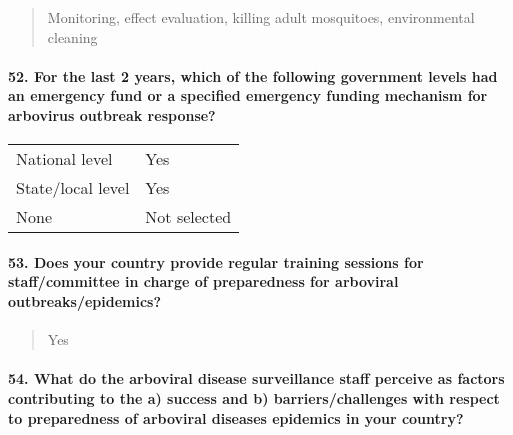 \documentclass[
]{article}
\begin{document}
\begin{quote}
Monitoring, effect evaluation, killing adult mosquitoes, environmental
cleaning
\end{quote}

\hypertarget{for-the-last-2-years-which-of-the-following-government-levels-had-an-emergency-fund-or-a-specified-emergency-funding-mechanism-for-arbovirus-outbreak-response}{%
\paragraph{52. For the last 2 years, which of the following government
levels had an emergency fund or a specified emergency funding mechanism
for arbovirus outbreak
response?}\label{for-the-last-2-years-which-of-the-following-government-levels-had-an-emergency-fund-or-a-specified-emergency-funding-mechanism-for-arbovirus-outbreak-response}}

\begin{longtable}[]{@{}ll@{}}
\toprule
\endhead
National level & Yes \\
State/local level & Yes \\
None & Not selected \\
\bottomrule
\end{longtable}

\hypertarget{does-your-country-provide-regular-training-sessions-for-staffcommittee-in-charge-of-preparedness-for-arboviral-outbreaksepidemics}{%
\paragraph{53. Does your country provide regular training sessions for
staff/committee in charge of preparedness for arboviral
outbreaks/epidemics?}\label{does-your-country-provide-regular-training-sessions-for-staffcommittee-in-charge-of-preparedness-for-arboviral-outbreaksepidemics}}

\begin{quote}
Yes
\end{quote}

\hypertarget{what-do-the-arboviral-disease-surveillance-staff-perceive-as-factors-contributing-to-the-a-success-and-b-barrierschallenges-with-respect-to-preparedness-of-arboviral-diseases-epidemics-in-your-country}{%
\paragraph{54. What do the arboviral disease surveillance staff perceive
as factors contributing to the a) success and b) barriers/challenges
with respect to preparedness of arboviral diseases epidemics in your
country?}\label{what-do-the-arboviral-disease-surveillance-staff-perceive-as-factors-contributing-to-the-a-success-and-b-barrierschallenges-with-respect-to-preparedness-of-arboviral-diseases-epidemics-in-your-country}}
\end{document}
